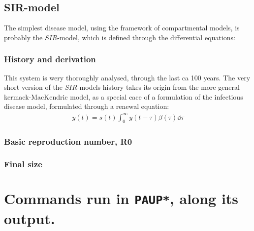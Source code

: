 \documentclass{article}
\begin{document}
\subsection{SIR-model}
The simplest disease model, using the framework of compartmental models, is probably the $SIR$-model, which is defined through the differential equations:

\subsubsection{History and derivation}
This system is wery thoroughly analysed, through the last ca 100 years. 
The very short version of the $SIR$-models history takes its origin from the more general kermack-MacKendric model, as a special cace of a formulation of the infectious disease model, formulated through a renewal equation:
\begin{align*}
	y(t) = s(t) \int_{0}^{\infty} y(t - \tau) \beta(\tau) \dd \tau
\end{align*}

\subsubsection{Basic reproduction number, R0}

\subsubsection{Final size}


\appendix

\newpage
\section{Commands run in \texttt{PAUP*}, along its output.} \label{sec:paup_code_0}





% 

% 
\end{document}
